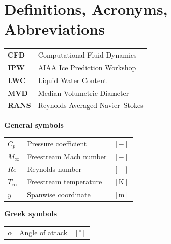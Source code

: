 \documentclass[letterpaper,times]{sae}
\begin{document}
\section{Definitions, Acronyms, Abbreviations}

\begin{table}[h]
\centering
\begin{tabular}{L{0.12\textwidth} L{0.35\textwidth}}
\textbf{CFD}    & Computational Fluid Dynamics \\
\textbf{IPW}    & AIAA Ice Prediction Workshop \\
\textbf{LWC}    & Liquid Water Content \\
\textbf{MVD}    & Median Volumetric Diameter \\
\textbf{RANS}   & Reynolds-Averaged Navier--Stokes \\
\end{tabular}
\end{table}


\textbf{General symbols}

\begin{table}[h]
\centering
\begin{tabular}{L{0.08\textwidth} L{0.29\textwidth} L{0.08\textwidth}}
$C_p$        & Pressure coefficient      & $[-]$ \\
$M_\infty$   & Freestream Mach number    & $[-]$ \\
$Re$         & Reynolds number           & $[-]$ \\
$T_\infty$   & Freestream temperature    & $[\mathrm{K}]$ \\
$y$          & Spanwise coordinate       & $[\mathrm{m}]$ \\
\end{tabular}
\end{table}


\textbf{Greek symbols}

\begin{table}[h]
\centering
\begin{tabular}{L{0.08\textwidth} L{0.29\textwidth} L{0.08\textwidth}}
$\alpha$ & Angle of attack & $[^\circ]$ \\
\end{tabular}
\end{table}
\end{document}
